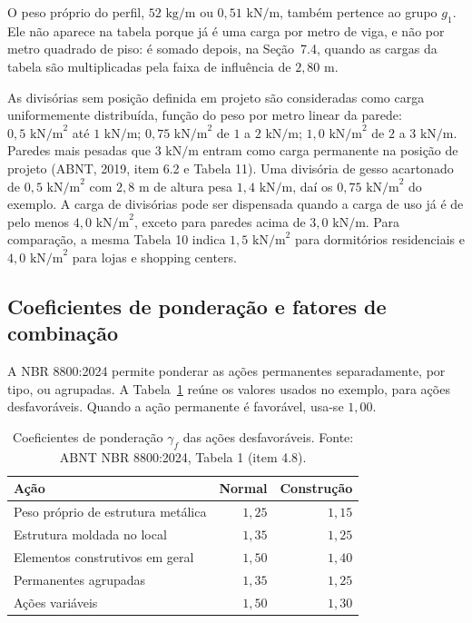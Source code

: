 \documentclass[11pt,a4paper]{article}
\begin{document}
O peso próprio do perfil, $52\text{ kg/m}$ ou $0{,}51\text{ kN/m}$, também pertence ao grupo $g_1$. Ele não aparece na tabela porque já é uma carga por metro de viga, e não por metro quadrado de piso: é somado depois, na Seção~7.4, quando as cargas da tabela são multiplicadas pela faixa de influência de $2{,}80\text{ m}$.

As divisórias sem posição definida em projeto são consideradas como carga uniformemente distribuída, função do peso por metro linear da parede: $0{,}5\text{ kN/m}^2$ até $1\text{ kN/m}$; $0{,}75\text{ kN/m}^2$ de $1$ a $2\text{ kN/m}$; $1{,}0\text{ kN/m}^2$ de $2$ a $3\text{ kN/m}$. Paredes mais pesadas que $3\text{ kN/m}$ entram como carga permanente na posição de projeto (ABNT, 2019, item 6.2 e Tabela 11). Uma divisória de gesso acartonado de $0{,}5\text{ kN/m}^2$ com $2{,}8\text{ m}$ de altura pesa $1{,}4\text{ kN/m}$, daí os $0{,}75\text{ kN/m}^2$ do exemplo. A carga de divisórias pode ser dispensada quando a carga de uso já é de pelo menos $4{,}0\text{ kN/m}^2$, exceto para paredes acima de $3{,}0\text{ kN/m}$. Para comparação, a mesma Tabela 10 indica $1{,}5\text{ kN/m}^2$ para dormitórios residenciais e $4{,}0\text{ kN/m}^2$ para lojas e shopping centers.

\subsection{Coeficientes de ponderação e fatores de combinação}

A NBR 8800:2024 permite ponderar as ações permanentes separadamente, por tipo, ou agrupadas. A Tabela~\ref{tab:gammaf} reúne os valores usados no exemplo, para ações desfavoráveis. Quando a ação permanente é favorável, usa-se $1{,}00$.

\begin{table}[!htbp]
  \centering
  \caption{Coeficientes de ponderação $\gamma_f$ das ações desfavoráveis. Fonte: ABNT NBR 8800:2024, Tabela 1 (item 4.8).}
  \label{tab:gammaf}
  \small
  \begin{tabularx}{\linewidth}{Xrr}
    \toprule
    \textbf{Ação} & \textbf{Normal} & \textbf{Construção} \\
    \midrule
    Peso próprio de estrutura metálica & $1{,}25$ & $1{,}15$ \\
    Estrutura moldada no local & $1{,}35$ & $1{,}25$ \\
    Elementos construtivos em geral & $1{,}50$ & $1{,}40$ \\
    Permanentes agrupadas & $1{,}35$ & $1{,}25$ \\
    Ações variáveis & $1{,}50$ & $1{,}30$ \\
    \bottomrule
  \end{tabularx}
\end{table}
\end{document}
